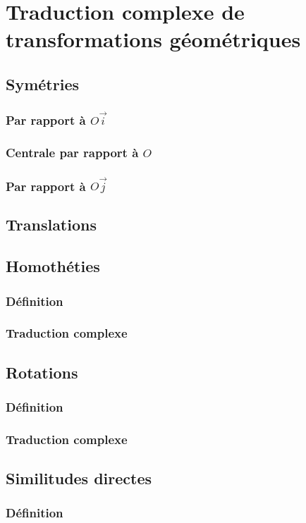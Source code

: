 \documentclass[12pt,a4paper,french]{book}
\begin{document}
	\section{Traduction complexe de transformations géométriques}
		\subsection{Symétries}
			\subsubsection{Par rapport à $O\overrightarrow{i}$}
			\subsubsection{Centrale par rapport à $O$}
			\subsubsection{Par rapport à $O\overrightarrow{j}$}
		\subsection{Translations}
		\subsection{Homothéties}
			\subsubsection{Définition}
			\subsubsection{Traduction complexe}
		\subsection{Rotations}
			\subsubsection{Définition}
			\subsubsection{Traduction complexe}
		\subsection{Similitudes directes}
			\subsubsection{Définition}
\end{document}
